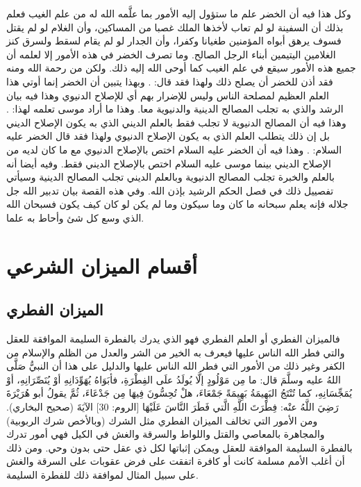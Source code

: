 وكل هذا فيه أن الخضر علم ما ستؤول إليه الأمور بما علَّمه الله له من علم الغيب فعلم بذلك أن السفينة لو لم تعاب لأخذها الملك غصبا من المساكين، وأن الغلام لو لم يقتل فسوف يرهق أبواه المؤمنين طغيانا وكفرا، وأن الجدار لو لم يقام لسقط ولسرق كنز الغلامين اليتيمين أبناء الرجل الصالح. وما تصرف الخضر في هذه الأمور إلا لعلمه أن جميع هذه الأمور سيقع في علم الغيب كما أوحى الله إليه ذلك. ولكن من رحمة الله ومنه فقد أذن للخضر أن يصلح ذلك ولهذا فقد قال: 
\quranayah*[18][82][25]{\footnotesize \surahname*[18]}. وبهذا يتبين أن الخضر إنما أوتي هذا العلم العظيم لمصلحة الناس وليس للإضرار بهم أي للإصلاح الدنيوي وهذا فيه بيان الرشد والذي به تجلب المصالح الدينية والدنيوية معا. وهذا ما أراد موسى تعلمه لهذا: 
\quranayah*[18][66]{\footnotesize \surahname*[18]}. وهذا فيه أن المصالح الدنيوية لا تجلب فقط بالعلم الديني الذي به يكون الإصلاح الديني بل إن ذلك يتطلب العلم الذي به يكون الإصلاح الدنيوي ولهذا فقد قال الخضر عليه السلام: 
 \quranayah*[18][67-68]{\footnotesize \surahname*[18]}. وهذا فيه أن الخضر عليه السلام اختص بالإصلاح الدنيوي مع ما كان لديه من الإصلاح الديني بينما موسى عليه السلام اختص بالإصلاح الديني فقط. وفيه أيضا أنه بالعلم والخبرة تجلب المصالح الدنيوية وبالعلم الديني تجلب المصالح الدينية وسيأتي تفصييل ذلك في فصل الحكم الرشيد بإذن الله. وفي هذه القصة بيان تدبير الله جل جلاله فإنه يعلم سبحانه ما كان وما سيكون وما لم يكن لو كان كيف يكون فسبحان الله الذي وسع كل شئ وأحاط به علما.

\section{أقسام الميزان الشرعي}

\subsection{الميزان الفطري}

فالميزان الفطري أو العلم الفطري فهو الذي يدرك بالفطرة السليمة الموافقة للعقل والتي فطر الله الناس عليها فيعرف به الخير من الشر والعدل من الظلم والإسلام من الكفر وغير ذلك من الأمور التي فطر الله الناس عليها والدليل على هذا أن النبيُّ صَلَّى اللهُ عليه وسلَّمَ قال: ما مِن مَوْلُودٍ إلَّا يُولَدُ علَى الفِطْرَةِ، فأبَوَاهُ يُهَوِّدَانِهِ أوْ يُنَصِّرَانِهِ، أوْ يُمَجِّسَانِهِ، كما تُنْتَجُ البَهِيمَةُ بَهِيمَةً جَمْعَاءَ، هلْ تُحِسُّونَ فِيهَا مِن جَدْعَاءَ، ثُمَّ يقولُ أبو هُرَيْرَةَ رَضِيَ اللَّهُ عنْه: {فِطْرَتَ اللَّهِ الَّتي فَطَرَ النَّاسَ عَلَيْهَا} [الروم: 30] الآيَةَ {\footnotesize (صحيح البخاري)}. ومن الأمور التي تخالف الميزان الفطري مثل الشرك (وبالأخص شرك الربوبية) والمجاهرة بالمعاصي والقتل واللواط والسرقة والغش في الكيل فهي أمور تدرك بالفطرة السليمة الموافقة للعقل ويمكن إثباتها لكل ذي عقل حتى بدون وحي. 
ومن ذلك أن أغلب الأمم مسلمة كانت أو كافرة اتفقت على فرض عقوبات على السرقة والغش على سبيل المثال لموافقة ذلك للفطرة السليمة. 

